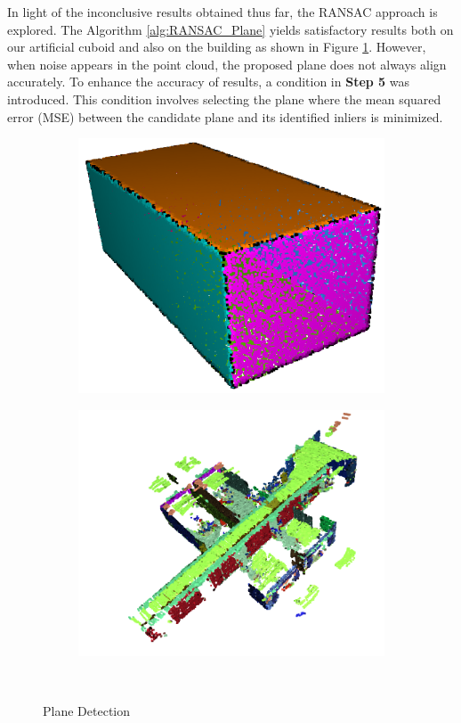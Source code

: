 In light of the inconclusive results obtained thus far, the RANSAC approach is explored. The Algorithm \ref{alg:RANSAC_Plane} yields satisfactory results both on our artificial cuboid and also on the building as shown in Figure \ref{fig:06_plane_detection}. However, when noise appears in the point cloud, the proposed plane does not always align accurately. To enhance the accuracy of results, a condition in \textbf{Step 5} was introduced. This condition involves selecting the plane where the mean squared error (MSE) between the candidate plane and its identified inliers is minimized.
\begin{figure}
    \begin{subfigure}{.48\linewidth}
    \centering
    \includegraphics[scale=0.4]{Img/06_plane_detection0.png}
    \end{subfigure}
    \begin{subfigure}{.48\linewidth}
    \centering
    \includegraphics[scale=0.4]{Img/06_plane_detection1.png}
    \end{subfigure}\\
    \caption{Plane Detection}
    \label{fig:06_plane_detection}
\end{figure}
